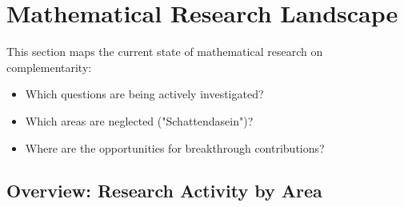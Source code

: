 \section{Mathematical Research Landscape}
\label{sec:research-landscape}

\begin{tcolorbox}[colback=purple!5!white,colframe=purple!75!black,title=\textbf{Research Frontier Map}]
This section maps the current state of mathematical research on complementarity:
\begin{itemize}[noitemsep]
    \item Which questions are being actively investigated?
    \item Which areas are neglected ("Schattendasein")?
    \item Where are the opportunities for breakthrough contributions?
\end{itemize}
\end{tcolorbox}

\subsection{Overview: Research Activity by Area}

